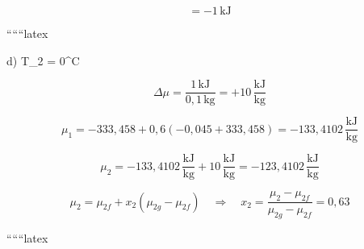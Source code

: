 \[
= -1 \, \text{kJ}
\]

``````latex


d) \quad T_2 = 0^\circ C

\[
\Delta \mu = \frac{1 \, \text{kJ}}{0,1 \, \text{kg}} = +10 \, \frac{\text{kJ}}{\text{kg}}
\]

\[
\mu_1 = -333,458 + 0,6 \left( -0,045 + 333,458 \right) = -133,4102 \, \frac{\text{kJ}}{\text{kg}}
\]

\[
\mu_2 = -133,4102 \, \frac{\text{kJ}}{\text{kg}} + 10 \, \frac{\text{kJ}}{\text{kg}} = -123,4102 \, \frac{\text{kJ}}{\text{kg}}
\]

\[
\mu_2 = \mu_{2f} + x_2 \left( \mu_{2g} - \mu_{2f} \right) \quad \Rightarrow \quad x_2 = \frac{\mu_2 - \mu_{2f}}{\mu_{2g} - \mu_{2f}} = 0,63
\]

``````latex


